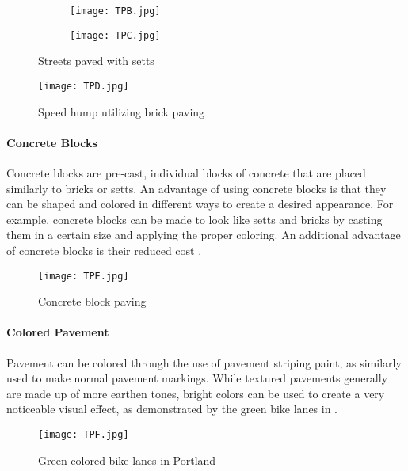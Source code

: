 \begin{figure}[h]
\centering
	\begin{subfigure}[t]{0.4\textwidth}
		\texttt{[image: TPB.jpg]}
	\end{subfigure}
	\begin{subfigure}[t]{0.4\textwidth}
		\texttt{[image: TPC.jpg]}
	\end{subfigure}
\caption{Streets paved with setts}\label{fig:TPBC}
\end{figure}



\begin{figure}[h]
\centering
\texttt{[image: TPD.jpg]}
\caption[Speed hump utilizing brick paving]{Speed hump utilizing brick paving}\label{fig:TPD}
\end{figure}

\paragraph{Concrete Blocks} Concrete blocks are pre-cast, individual blocks of concrete that are placed similarly to bricks or setts. An advantage of using concrete blocks is that they can be shaped and colored in different ways to create a desired appearance. For example, concrete blocks can be made to look like setts and bricks by casting them in a certain size and applying the proper coloring. An additional advantage of concrete blocks is their reduced cost \cite{TP5}.

\begin{figure}[h]
\centering
\texttt{[image: TPE.jpg]}
\caption[Concrete block paving]{Concrete block paving}\label{fig:TPE}
\end{figure}

\paragraph{Colored Pavement}Pavement can be colored through the use of pavement striping paint, as similarly used to make normal pavement markings. While textured pavements generally are made up of more earthen tones, bright colors can be used to create a very noticeable visual effect, as demonstrated by the green bike lanes in .

\begin{figure}[h]
\centering
\texttt{[image: TPF.jpg]}
\caption[Green-colored bike lanes in Portland]{Green-colored bike lanes in Portland}\label{fig:TPF}
\end{figure}


